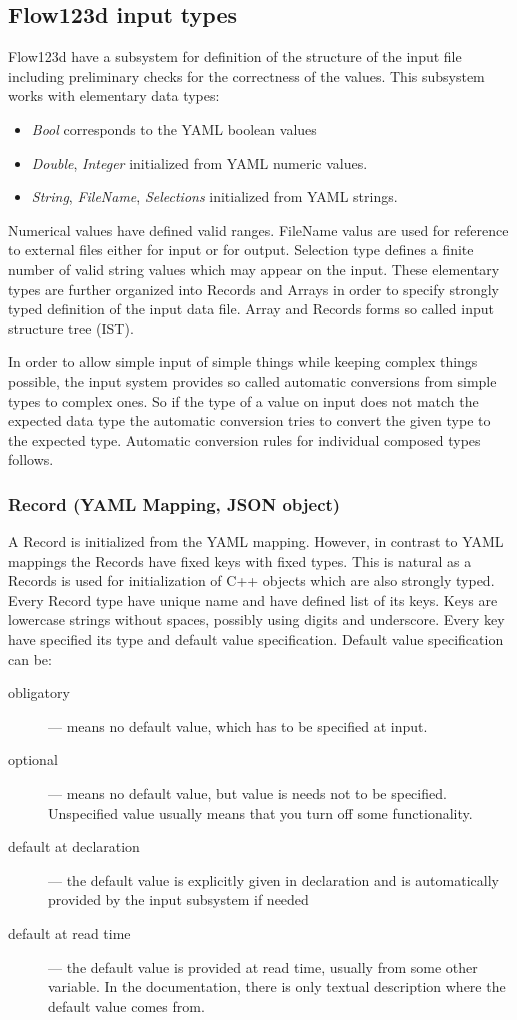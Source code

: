 \subsection{Flow123d input types}
\label{sec:input_types}
Flow123d have a subsystem for definition of the structure of the input file including preliminary checks for the 
correctness of the values. This subsystem works with elementary data types:
\begin{itemize}
 \item {\it Bool} corresponds to the YAML boolean values
 \item {\it Double}, {\it Integer} initialized from YAML numeric values. 
 \item {\it String}, {\it FileName}, {\it Selections} initialized from YAML strings.
\end{itemize}
Numerical values have defined valid ranges. FileName valus are used for reference to external files either for input or for output.
Selection type defines a finite number of valid string values which may appear on the input. 
These elementary types are further organized into Records and Arrays in order to specify strongly typed definition of the 
input data file. Array and Records forms so called input structure tree (IST).

In order to allow simple input of simple things while keeping complex things possible, the input system provides
so called automatic conversions from simple types to complex ones. 
So if the type of a value on input does not match the expected data type the automatic conversion tries to convert 
the given type to the expected type. Automatic conversion rules for individual composed types follows.

\subsubsection{Record (YAML Mapping, JSON object)}
A Record is initialized from the YAML mapping. However, in contrast to YAML mappings 
the Records have fixed keys with fixed types. 
This is natural as a Records is used for initialization of C++ objects which 
are also strongly typed. Every Record type have unique name and have defined list of its keys.
Keys are lowercase strings without spaces, possibly using digits and underscore. Every key have 
specified its type and default value specification. Default value specification can be:
\begin{description} 
 \item[obligatory] --- means no default value, which has to be specified at input. 
 \item[optional] --- means no default value, but value is needs not to be specified. Unspecified value usually means that you turn off some functionality.
 \item[default at declaration] --- the default value is explicitly given in declaration and is automatically provided by the input subsystem if needed
 \item[default at read time] --- the default value is provided at read time, usually from some other variable. In the documentation, 
 there is only textual description where the default value comes from.
\end{description}

